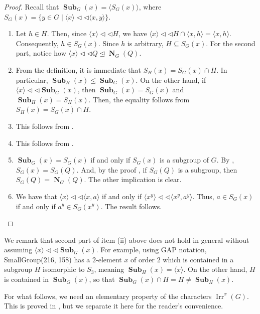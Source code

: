 \documentclass[12pt]{amsart}
\DeclareMathOperator{\NB}{\mathbf{N}}
\DeclareMathOperator{\Sub}{\mathbf{Sub}}
\DeclareMathOperator{\Irr}{Irr}
\theoremstyle{remark}
\theoremstyle{definition}
\theoremstyle{plain}
\theoremstyle{definition}
\numberwithin{equation}{section}
\begin{document}
\begin{proof}
	Recall that $\Sub_G(x) = \langle S_G(x) \rangle$, where $S_G(x) = \{y \in G \mid \langle x \rangle {\triangleleft}{\triangleleft} \langle x, y \rangle\}$.
	\begin{enumerate}
		\item Let $h \in H$. Then, since $\langle x \rangle {\triangleleft}{\triangleleft} H$, we have $\langle x \rangle {\triangleleft}{\triangleleft} H \cap \langle x, h \rangle = \langle x, h \rangle$. Consequently, $h \in S_G(x)$. Since $h$ is arbitrary, $H \subseteq S_G(x)$. For the second part, notice how $\langle x \rangle {\triangleleft}{\triangleleft} Q \unlhd \NB_G(Q)$.
		\item From the definition, it is immediate that $S_H(x) = S_G(x) \cap H$. In particular, $\Sub_H(x) \leq \Sub_G(x)$. On the other hand, if $\langle x \rangle {\triangleleft}{\triangleleft} \Sub_G(x)$, then $\Sub_G(x) = S_G(x)$ and $\Sub_H(x) = S_H(x)$. Then, the equality follows from $S_H(x) = S_G(x) \cap H$.
		\item This follows from \cite[Lemma 2.3]{CasoloSubnormalizers}.
		\item This follows from \cite[Lemma 1.2]{CasoloSubnormalizersSubgroups}.
		\item $\Sub_G(x) = S_G(x)$ if and only if $S_G(x)$ is a subgroup of $G$. By \cite[Proposition 2.1 (b)]{CasoloSubnormalizers}, $S_G(x) = S_G(Q)$. And, by the proof \cite[Proposition 1.4]{CasoloSubnormalizersSubgroups}, if $S_G(Q)$ is a subgroup, then $S_G(Q) = \NB_G(Q)$. The other implication is clear.
		\item We have that $\langle x \rangle {\triangleleft}{\triangleleft} \langle x, a \rangle$ if and only if $\langle x^y \rangle {\triangleleft}{\triangleleft} \langle x^y, a^y \rangle$. Thus, $a \in S_G(x)$ if and only if $a^y \in S_G(x^y)$. The result follows.
	\end{enumerate}
\end{proof}

We remark that second part of item (ii) above does not hold in general without assuming $\langle x \rangle {\triangleleft}{\triangleleft} \Sub_G(x)$. For example, using GAP \cite{GAP} notation, SmallGroup(216, 158) has a $2$-element $x$ of order $2$ which is contained in a subgroup $H$ isomorphic to $S_3$, meaning $\Sub_H(x) = \langle x \rangle$. On the other hand, $H$ is contained in $\Sub_G(x)$, so that $\Sub_G(x) \cap H = H \neq \Sub_H(x)$.

For what follows, we need an elementary property of the characters $\Irr^x(G)$. This is proved in \cite[Lemma 4.3]{PickyPSolvable}, but we separate it here for the reader's convenience.
\end{document}
